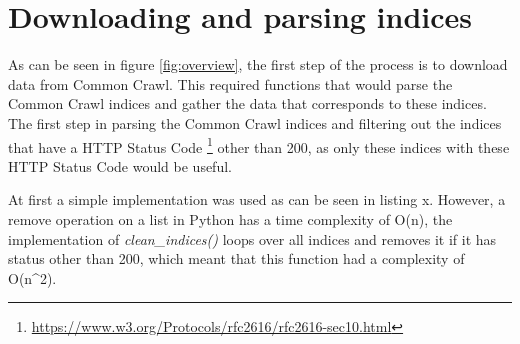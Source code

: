 \section{Downloading and parsing indices}
As can be seen in figure \ref{fig:overview}, the first step of the process is to download data from Common Crawl. This required functions that would parse the Common Crawl indices and gather the data that corresponds to these indices. The first step in parsing the Common Crawl indices and filtering out the indices that have a HTTP Status Code \footnote{\url{https://www.w3.org/Protocols/rfc2616/rfc2616-sec10.html}} other than 200, as only these indices with these HTTP Status Code would be useful. 

At first a simple implementation was used as can be seen in listing x. However, a remove operation on a list in Python has a time complexity of O(n), the implementation of \textit{clean_indices()} loops over all indices and removes it if it has status other than 200, which meant that this function had a complexity of O(n^2). 
